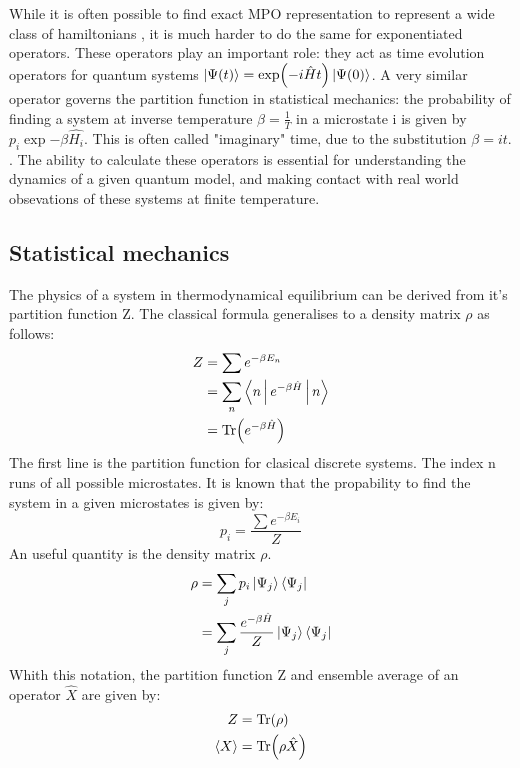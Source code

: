 
While it is often possible to find exact MPO representation to represent a wide class of hamiltonians , it is much harder to do the same for exponentiated operators. These operators play an important role: they act as time evolution operators for quantum systems $ \ket{\Psi(t)} = \exp( -i \hat{H} t ) \ket{\Psi(0)}$. A very similar operator governs the partition function in statistical mechanics: the probability of finding a system at inverse temperature $\beta = \frac{1}{T}$ in a microstate i is given by $p_i\exp{ - \beta \hat{H_i} }$. This is often called "imaginary" time, due to the substitution $\beta = i t$. . The ability to calculate these operators is essential for understanding the dynamics of a given quantum model, and making contact with real world obsevations of these systems at finite temperature.

\subsection{Statistical mechanics}

The physics of a system in thermodynamical equilibrium can be derived from it's partition function Z. The classical formula generalises to a density matrix $\rho$ as follows:
\begin{equation}
  \begin{split}
    Z &= \sum e^{ - \beta E_n} \\
    &= \sum_n \Braket{n | e^{ - \beta \hat{H} }  | n} \\
    &= \Tr( e^{ - \beta \hat{H} } )
  \end{split}
\end{equation}
The first line is the partition function for clasical discrete systems. The index n runs of all possible microstates. It is known that the propability to find the system in a given microstates is given by:
\begin{equation}
  p_i = \frac{\sum e^{ - \beta E_i}}{Z}
\end{equation}
An useful quantity is the density matrix $\rho$.
\begin{equation}
  \begin{split}
    \rho &= \sum_j p_i  \Ket{ \Psi_j} \Bra{\Psi_j}   \\
    &= \sum_j \frac{ e^{ - \beta \hat{H} } }{Z}  \Ket{ \Psi_j} \Bra{\Psi_j}
  \end{split}
\end{equation}
Whith this notation, the partition function Z and ensemble average of an operator $\hat{X}$ are given by:
\begin{equation}
  \begin{split}
    Z &= \Tr( \rho) \\
    \Braket{X} &= \Tr(\rho \hat{X})
  \end{split}
\end{equation}

